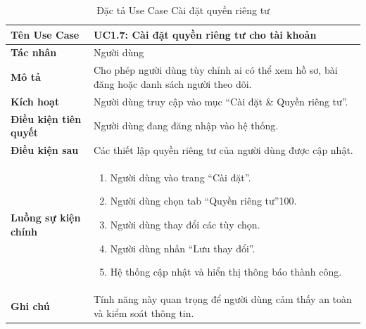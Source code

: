 \begin{table}[H]
\centering
\begin{tabularx}{\textwidth}{|l|X|}
\hline
\textbf{Tên Use Case} & \textbf{UC1.7: Cài đặt quyền riêng tư cho tài khoản} \\ \hline
\textbf{Tác nhân} & Người dùng \\ \hline
\textbf{Mô tả} & Cho phép người dùng tùy chỉnh ai có thể xem hồ sơ, bài đăng hoặc danh sách người theo dõi. \\ \hline
\textbf{Kích hoạt} & Người dùng truy cập vào mục ``Cài đặt \& Quyền riêng tư''. \\ \hline
\textbf{Điều kiện tiên quyết} & Người dùng đang đăng nhập vào hệ thống. \\ \hline
\textbf{Điều kiện sau} & Các thiết lập quyền riêng tư của người dùng được cập nhật. \\ \hline
\textbf{Luồng sự kiện chính} & 
\begin{enumerate}
    \item Người dùng vào trang ``Cài đặt''.
    \item Người dùng chọn tab ``Quyền riêng tư''100.
    \item Người dùng thay đổi các tùy chọn.
    \item Người dùng nhấn ``Lưu thay đổi''.
    \item Hệ thống cập nhật và hiển thị thông báo thành công.
\end{enumerate} \\ \hline
\textbf{Ghi chú} & Tính năng này quan trọng để người dùng cảm thấy an toàn và kiểm soát thông tin. \\ \hline
\end{tabularx}
\caption{Đặc tả Use Case Cài đặt quyền riêng tư}
\end{table}

